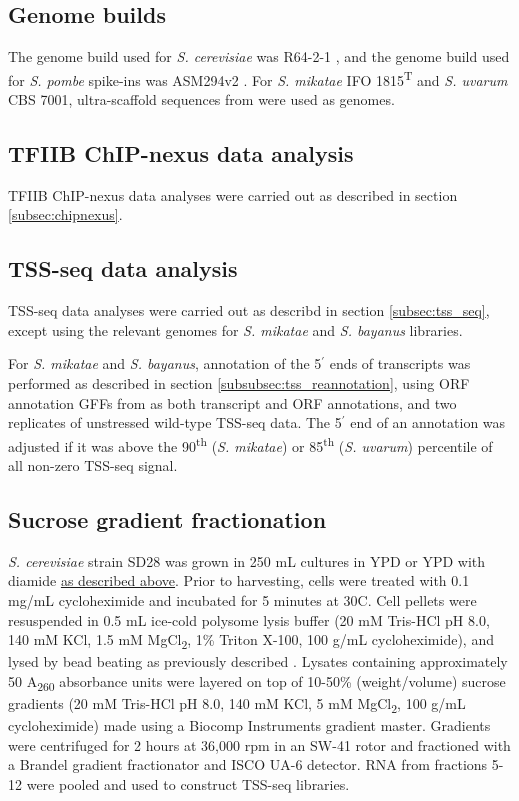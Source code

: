 \subsection{Genome builds}

The genome build used for \textit{S. cerevisiae} was R64-2-1 \citep{engel2014}, and the genome build used for \textit{S. pombe} spike-ins was ASM294v2 \citep{wood2002}.
For \textit{S. mikatae }IFO 1815\textsuperscript{T} and \textit{S. uvarum }CBS 7001, ultra-scaffold sequences from \citet{scannell11} were used as genomes.

\subsection{TFIIB ChIP-nexus data analysis}

TFIIB ChIP-nexus data analyses were carried out as described in section \ref{subsec:chipnexus}.

\subsection{TSS-seq data analysis}

TSS-seq data analyses were carried out as describd in section \ref{subsec:tss_seq}, except using the relevant genomes for \textit{S. mikatae} and \textit{S. bayanus} libraries.

For \textit{S. mikatae} and \textit{S. bayanus}, annotation of the 5$^\prime$ ends of transcripts was performed as described in section \ref{subsubsec:tss_reannotation}, using ORF annotation GFFs from \citet{scannell11} as both transcript and ORF annotations, and two replicates of unstressed wild-type TSS-seq data.
The 5$^\prime$ end of an annotation was adjusted if it was above the 90\textsuperscript{th} (\textit{S. mikatae}) or 85\textsuperscript{th} (\textit{S. uvarum}) percentile of all non-zero TSS-seq signal.

\subsection{Sucrose gradient fractionation}

\textit{S. cerevisiae} strain SD28 was grown in 250 mL cultures in YPD or YPD with diamide \hyperref[subsec:stress_growth_conditions]{as described above}.
Prior to harvesting, cells were treated with 0.1 mg/mL cycloheximide and incubated for 5 minutes at 30\textdegree C.
Cell pellets were resuspended in 0.5 mL ice-cold polysome lysis buffer (20 mM Tris-HCl pH 8.0, 140 mM KCl, 1.5 mM MgCl\textsubscript{2}, 1\% Triton X-100, 100 \textmu g/mL cycloheximide), and lysed by bead beating as previously described \citep{degennaro2013}.
Lysates containing approximately 50 A\textsubscript{260} absorbance units were layered on top of 10-50\% (weight/volume) sucrose gradients (20 mM Tris-HCl pH 8.0, 140 mM KCl, 5 mM MgCl\textsubscript{2}, 100 \textmu g/mL cycloheximide) made using a Biocomp Instruments gradient master.
Gradients were centrifuged for 2 hours at 36,000 rpm in an SW-41 rotor and fractioned with a Brandel gradient fractionator and ISCO UA-6 detector.
RNA from fractions 5-12 were pooled and used to construct TSS-seq libraries.


